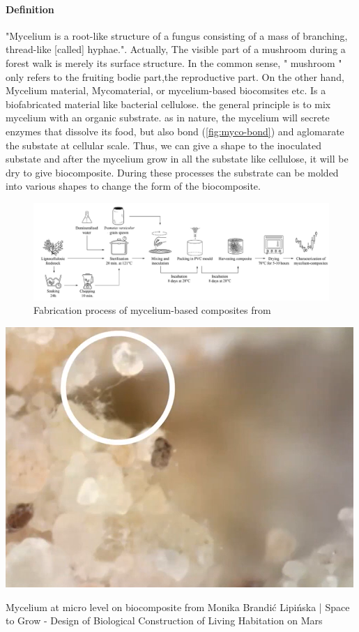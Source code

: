 \paragraph[short]{Definition}
"Mycelium is a root-like structure of a fungus consisting of a mass of branching, thread-like [called] hyphae."\cite{wikipediaMycelium}. Actually, The visible part of a mushroom during a forest walk is merely its surface structure. In the common sense, " mushroom " only refers to the fruiting bodie part,the reproductive part. 
On the other hand, Mycelium material, Mycomaterial, or mycelium-based biocomsites etc. Is a biofabricated material like bacterial cellulose. the general principle is to mix mycelium with an organic substrate. as in nature, the mycelium will secrete enzymes that dissolve its food, but also bond\cite{MonikaBrandićLipińskaHBBE} (\ref{fig:myco-bond}) and aglomarate the substate at cellular scale. 
Thus, we can give a shape to the inoculated substate and after the mycelium grow in all the substate like cellulose, it will be dry to give biocomposite. During these processes the substrate can be molded into various shapes to change the form of the biocomposite. 

\begin{figure}[h]
    \centering
    \includegraphics{images/Fabrication_process.png}
    \caption{Fabrication process of mycelium-based composites from  \cite{elsacker2019mechanical}}
    \label{fig:Fab_process}
\end{figure} 

\begin{marginfigure}
    \centering
    \includegraphics{images/bond-mycelium.png}    
    \caption{Mycelium at micro level on biocomposite from  Monika Brandić Lipińska | Space to Grow - Design of Biological Construction of Living Habitation on Mars}
    \label{fig:myco-bond}
\end{marginfigure}

